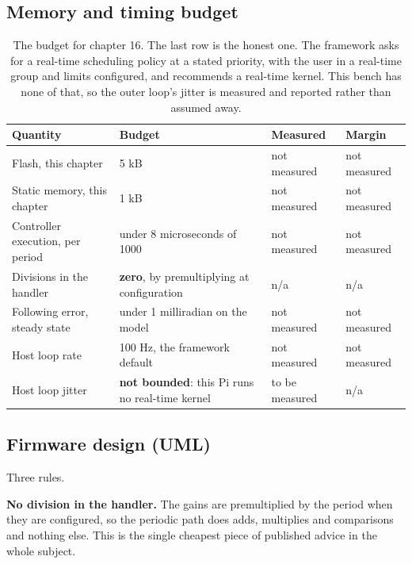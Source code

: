 \subsection*{Memory and timing budget}

\begin{table}[H]\centering\small
\begin{tabular}{p{44mm}p{28mm}p{28mm}p{30mm}}
\toprule
Quantity & Budget & Measured & Margin \\
\midrule
Flash, this chapter & 5 kB & not measured & not measured \\
Static memory, this chapter & 1 kB & not measured & not measured \\
Controller execution, per period & under 8 microseconds of 1000 & not measured & not measured \\
Divisions in the handler & \textbf{zero}, by premultiplying at configuration & n/a & n/a \\
Following error, steady state & under 1 milliradian on the model & not measured & not measured \\
Host loop rate & 100 Hz, the framework default & not measured & not measured \\
Host loop jitter & \textbf{not bounded}: this Pi runs no real-time kernel & to be measured & n/a \\
\bottomrule
\end{tabular}
\caption{The budget for chapter 16. The last row is the honest one. The framework asks for a real-time scheduling policy at a stated priority, with the user in a real-time group and limits configured, and recommends a real-time kernel. This bench has none of that, so the outer loop's jitter is measured and reported rather than assumed away.}
\end{table}

\subsection*{Firmware design (UML)}


Three rules.

\textbf{No division in the handler.} The gains are premultiplied by the period
when they are configured, so the periodic path does adds, multiplies and
comparisons and nothing else. This is the single cheapest piece of published
advice in the whole subject.

